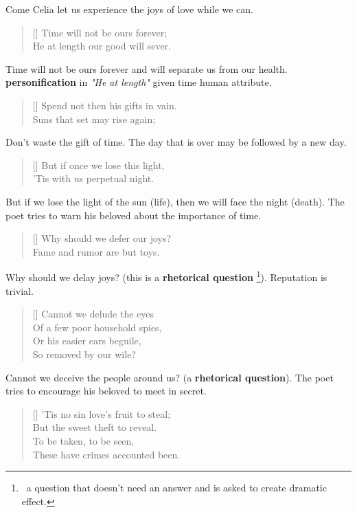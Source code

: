 Come Celia let us experience the joys of love while we can.

\begin{verse}[\versewidth]
{\fontverse
Time will not be ours forever;\\
He at length our good will sever.
}
\end{verse}

Time will not be ours forever and will separate us from 
our health.  \textbf{personification} in \textit{"He at length"}
given time human attribute.

\begin{verse}[\versewidth]
{\fontverse
Spend not then his gifts in vain.\\
Suns that set may rise again;
}
\end{verse}

Don't waste the gift of time. The day that is over 
may be followed by a new day.

\begin{verse}[\versewidth]
{\fontverse
But if once we lose this light,\\
'Tis with us perpetual night.
}
\end{verse}

But if we lose the light of the sun (life), then 
we will face the night (death). The poet tries to warn 
his beloved about the importance of time.

\begin{verse}[\versewidth]
{\fontverse
Why should we defer our joys?\\
Fame and rumor are but toys.
}
\end{verse}

Why should we delay joys? (this is a \textbf{rhetorical question}
\footnote{\, a question that doesn't need an answer and is asked to create dramatic effect.}).
Reputation is trivial. 

\begin{verse}[\versewidth]
{\fontverse
Cannot we delude the eyes\\
Of a few poor household spies,\\
Or his easier ears beguile,\\
So removed by our wile?
}
\end{verse}

Cannot we deceive the people around us? (a \textbf{rhetorical question}).
The poet tries to encourage his beloved to meet in secret.

\begin{verse}[\versewidth]
{\fontverse
'Tis no sin love's fruit to steal;\\
But the sweet theft to reveal.\\
To be taken, to be seen,\\
These have crimes accounted been.
}
\end{verse}


